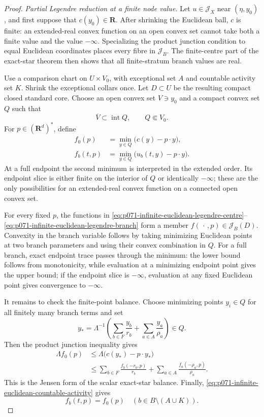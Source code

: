 \begin{proof}
\medskip\noindent
\emph{Partial Legendre reduction at a finite node value.}
Let $u\in\mathcal J_X$ near $(\eta,y_0)$, and first suppose that
$c(y_0)\in\mathbf R$.  After shrinking the Euclidean ball, $c$ is
finite: an extended-real convex function on an open convex set cannot take
both a finite value and the value $-\infty$.  Specializing the product
junction condition to equal Euclidean coordinates places every fibre in
$\mathscr J_B$.  The finite-centre part of the exact-star theorem then
shows that all finite-stratum branch values are real.

Use a comparison chart on $U\times V_0$, with exceptional set $A$ and
countable activity set $K$.  Shrink the exceptional collars once.  Let
$D\subset U$ be the resulting compact closed standard core.  Choose an
open convex set $V\ni y_0$ and a compact convex set $Q$ such that
\[
                  \overline V\subset\operatorname{int}Q,
                  \qquad Q\Subset V_0.
\]
For
$p\in(\mathbf R^d)^*$, define
\begin{align}
 f_0(p)&=\min_{y\in Q}\bigl(c(y)-p\mathbin\cdot y\bigr),
 \label{eq:p071-infinite-euclidean-legendre-centre}\\
 f_b(t,p)&=\min_{y\in Q}
       \bigl(u_b(t,y)-p\mathbin\cdot y\bigr).
 \label{eq:p071-infinite-euclidean-legendre-branch}
\end{align}
At a full endpoint the second minimum is interpreted in the extended
order.  Its endpoint slice is either finite on the interior of $Q$ or
identically $-\infty$; these are the only possibilities for an
extended-real convex function on a connected open convex set.

For every fixed $p$, the functions in
\eqref{eq:p071-infinite-euclidean-legendre-centre}--%
\eqref{eq:p071-infinite-euclidean-legendre-branch} form a member
$f(\,\cdot\,,p)\in\mathscr J_B(D)$.  Convexity in the branch variable
follows by taking minimizing Euclidean points at two branch parameters and
using their convex combination in $Q$.  For a full branch, exact endpoint
trace passes through the minimum: the lower bound follows from
monotonicity, while evaluation at a minimizing endpoint point gives the
upper bound; if the endpoint slice is $-\infty$, evaluation at any fixed
Euclidean point gives convergence to $-\infty$.

It remains to check the finite-point balance.  Choose minimizing points
$y_i\in Q$ for all finitely many branch terms and set
\[
 y_*=\Lambda^{-1}
 \left(\sum_{b\in F}\frac{y_b}{r_b}
       +\sum_{a\in A}\frac{y_a}{\rho_a}\right)\in Q.
\]
Then the product junction inequality gives
\begin{align*}
 \Lambda f_0(p)
 &\leq \Lambda\bigl(c(y_*)-p\mathbin\cdot y_*\bigr)\\
 &\leq
 \sum_{b\in F}\frac{f_b(-r_b,p)}{r_b}
 +\sum_{a\in A}\frac{f_a(-\rho_a,p)}{\rho_a}.
\end{align*}
This is the Jensen form of the scalar exact-star balance.  Finally,
\eqref{eq:p071-infinite-euclidean-countable-activity} gives
\begin{equation}
 f_b(t,p)=f_0(p)
 \quad(b\in B\setminus(A\cup K)).
 \label{eq:p071-infinite-euclidean-legendre-inactive}
\end{equation}


\end{proof}
